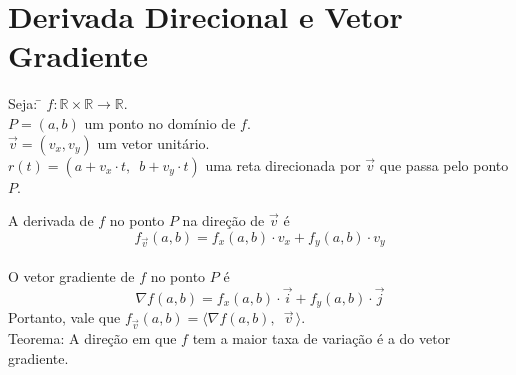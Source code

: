 \documentclass{article}
\begin{document}
\section{Derivada Direcional e Vetor Gradiente}
\begin{tabbing}
Seja: \= $f : \mathbb{R} \times \mathbb{R} \rightarrow \mathbb{R}$. \\[5pt]
  \> $P = (a, b)$ um ponto no domínio de $f$. \\[5pt]
  \> $\vec{v} = (v_x, v_y)$ um vetor unitário. \\[5pt]
  \> $r(t) = (a + v_x \cdot t, \enspace b + v_y \cdot t)$ uma reta direcionada por $\vec{v}$ que passa pelo ponto $P$.
\end{tabbing}
\vspace{10pt}
A derivada de $f$ no ponto $P$ na direção de $\vec{v}$ é
\[ f_{\vec{v}}(a,b) = f_x(a,b) \cdot v_x + f_y(a,b) \cdot v_y \] \\
O vetor gradiente de $f$ no ponto $P$ é
\[ \nabla f(a,b) = f_x(a,b) \cdot \vec{i} + f_y(a,b) \cdot \vec{j} \]
Portanto, vale que $f_{\vec{v}}(a,b) = \langle \nabla f(a,b), \enspace \vec{v} \, \rangle$. \\[20pt]
Teorema: A direção em que $f$ tem a maior taxa de variação é a do vetor gradiente.
\end{document}
